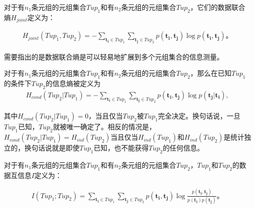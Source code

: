 \begin{defn}[数据联合熵]

对于有$n_1$条元组的元组集合$Tup_1$和有$n_2$条元组的元组集合$Tup_2$，它们的数据联合熵$H_{joint}$定义为：

\begin{equation}\label{eq:joint_entropy}
  \begin{aligned}
    H_{joint}(Tup_1,Tup_2)=-\sum_{\bm{t_i} \in Tup_1} \sum_{\bm{t_j} \in Tup_2} p(\bm{t_i},\bm{t_j}) \log p(\bm{t_i},\bm{t_j})。
  \end{aligned}
\end{equation}

\label{def:data_joint_entropy}
\end{defn}

需要指出的是数据联合熵是可以轻易地扩展到多个元组集合的信息测量。

\begin{defn}[数据条件熵]
对于有$n_1$条元组的元组集合$Tup_1$和有$n_2$条元组的元组集合$Tup_2$，那么在已知$Tup_1$的条件下$Tup_2$的信息熵被定义为
\begin{equation}\label{eq:conditional_entropy}
  \begin{aligned}
    H_{cond}(Tup_2|Tup_1)=-\sum_{\bm{t_i} \in Tup_1} \sum_{\bm{t_j} \in Tup_2} p(\bm{t_i},\bm{t_j})\log p(\bm{t_j}|\bm{t_i}),
  \end{aligned}
\end{equation}
\label{def:data_conditional_entropy}
\end{defn}
其中$H_{cond}(Tup_2|Tup_1)=0$，当且仅当$Tup_2$被$Tup_1$完全决定。换句话说，一旦$Tup_1$已知，$Tup_2$就被唯一确定了。相反的情况是，$H_{cond}(Tup_2|Tup_1)=H_{ind}(Tup_2)$当且仅当$H_{ind}(Tup_1)$和$H_{ind}(Tup_2)$是统计独立的，换句话说就是即使$Tup_1$已知，也不能获得$Tup_2$的任何信息。

\begin{defn}[数据互信息]
对于有$n_1$条元组的元组集合$Tup_1$和有$n_2$条元组的元组集合$Tup_2$，$Tup_1$和$Tup_2$的数据互信息$I$定义为：

\begin{equation}
\label{eq:mutual_information}
  \begin{aligned}
    I(Tup_1;Tup_2)=\sum_{\bm{t_i} \in Tup_1} \sum_{\bm{t_j} \in Tup_2} p(\bm{t_i},\bm{t_j}) \log\frac{p(\bm{t_i},\bm{t_j})}{p(\bm{t_i})p(\bm{t_j})}。
  \end{aligned}
\end{equation}

\label{def:data_mutal_information}
\end{defn}


